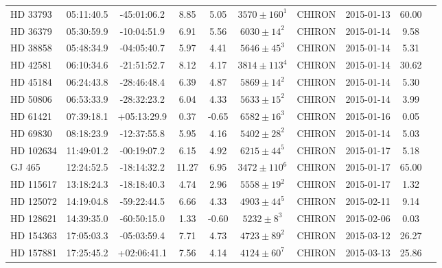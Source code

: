 \begin{scriptsize}
\begin{longtable}{lcccccrccc}
   HD 33793 &   05:11:40.5 &   -45:01:06.2 &   8.85 &  5.05 &    $3570 \pm 160^{1}$ &      CHIRON &      2015-01-13 &             60.00  \\
   HD 36379 &   05:30:59.9 &   -10:04:51.9 &   6.91 &  5.56 &     $6030 \pm 14^{2}$ &      CHIRON &      2015-01-14 &              9.58  \\
   HD 38858 &   05:48:34.9 &   -04:05:40.7 &   5.97 &  4.41 &     $5646 \pm 45^{3}$ &      CHIRON &      2015-01-14 &              5.31  \\
   HD 42581 &   06:10:34.6 &   -21:51:52.7 &   8.12 &  4.17 &    $3814 \pm 113^{4}$ &      CHIRON &      2015-01-14 &             30.62  \\
   HD 45184 &   06:24:43.8 &   -28:46:48.4 &   6.39 &  4.87 &     $5869 \pm 14^{2}$ &      CHIRON &      2015-01-14 &              5.30  \\
   HD 50806 &   06:53:33.9 &   -28:32:23.2 &   6.04 &  4.33 &     $5633 \pm 15^{2}$ &      CHIRON &      2015-01-14 &              3.99  \\
   HD 61421 &   07:39:18.1 &   +05:13:29.9 &   0.37 & -0.65 &     $6582 \pm 16^{3}$ &      CHIRON &      2015-01-16 &              0.05  \\
   HD 69830 &   08:18:23.9 &   -12:37:55.8 &   5.95 &  4.16 &     $5402 \pm 28^{2}$ &      CHIRON &      2015-01-14 &              5.03  \\
   HD 102634 &   11:49:01.2 &   -00:19:07.2 &   6.15 &  4.92 &     $6215 \pm 44^{5}$ &      CHIRON &      2015-01-17 &              5.18  \\
     GJ 465 &   12:24:52.5 &   -18:14:32.2 &  11.27 &  6.95 &    $3472 \pm 110^{6}$ &      CHIRON &      2015-01-17 &             65.00  \\
   HD 115617 &   13:18:24.3 &   -18:18:40.3 &   4.74 &  2.96 &     $5558 \pm 19^{2}$ &      CHIRON &      2015-01-17 &              1.32  \\
   HD 125072 &   14:19:04.8 &   -59:22:44.5 &   6.66 &  4.33 &     $4903 \pm 44^{5}$ &      CHIRON &      2015-02-11 &              9.14  \\
   HD 128621 &   14:39:35.0 &   -60:50:15.0 &   1.33 & -0.60 &      $5232 \pm 8^{3}$ &      CHIRON &      2015-02-06 &              0.03  \\
  HD 154363 &   17:05:03.3 &   -05:03:59.4 &   7.71 &  4.73 &     $4723 \pm 89^{2}$ &      CHIRON &      2015-03-12 &             26.27  \\
  HD 157881 &   17:25:45.2 &   +02:06:41.1 &   7.56 &  4.14 &     $4124 \pm 60^{7}$ &      CHIRON &      2015-03-13 &             25.86  \\

\end{longtable}
\end{scriptsize}
